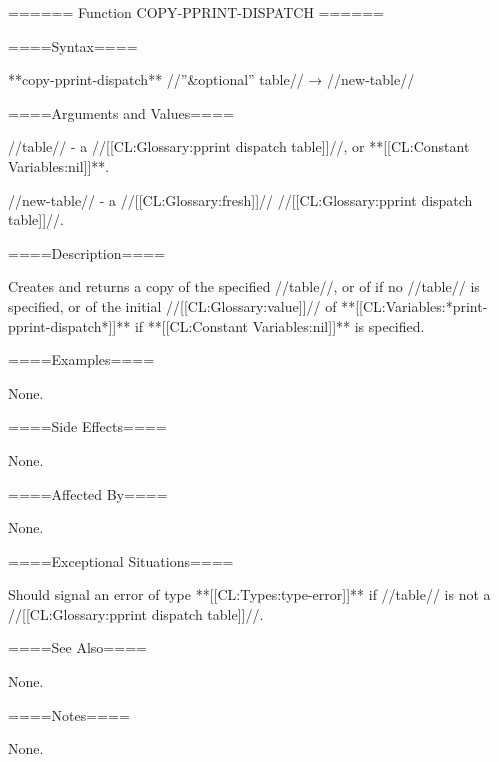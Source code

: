 ====== Function COPY-PPRINT-DISPATCH ======

====Syntax====

**copy-pprint-dispatch** //''&optional'' table// → //new-table//

====Arguments and Values====

//table// - a //[[CL:Glossary:pprint dispatch table]]//, or **[[CL:Constant Variables:nil]]**.

//new-table// - a //[[CL:Glossary:fresh]]// //[[CL:Glossary:pprint dispatch table]]//.

====Description====

Creates and returns a copy of the specified //table//, or of  if no //table// is specified, or of the initial //[[CL:Glossary:value]]// of **[[CL:Variables:*print-pprint-dispatch*]]** if **[[CL:Constant Variables:nil]]** is specified.

====Examples====

None.

====Side Effects====

None.

====Affected By====

None.

====Exceptional Situations====

Should signal an error of type **[[CL:Types:type-error]]** if //table// is not a //[[CL:Glossary:pprint dispatch table]]//.

====See Also====

None.

====Notes====

None.

